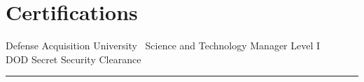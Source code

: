 \documentclass[letterpaper]{deedy-resume}
\begin{document}
\begin{minipage}[t]{0.3\textwidth}
\section{Certifications}

\vspace{1em}

\textbullet{} Defense Acquisition University \textemdash\ Science and Technology Manager Level I\\
\textbullet{} DOD Secret Security Clearance
\sectionspace
\vspace{-1ex}
\rule{5cm}{0.5pt}

\end{minipage} %
\hfill
\vrule
\hspace{3ex}
%
%
\end{document}
